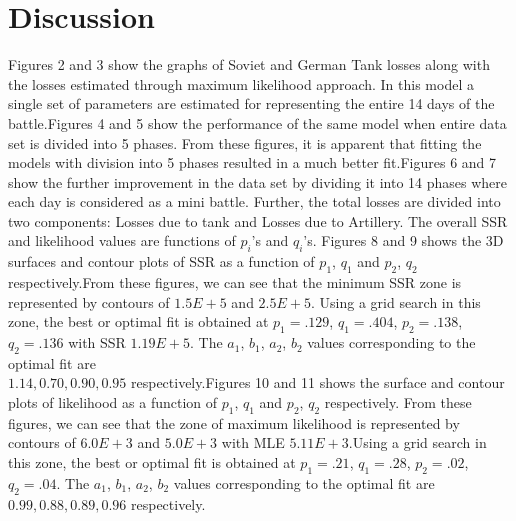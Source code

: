 \documentclass[]{article}
\begin{document}
\section{Discussion}
Figures 2 and 3 show the graphs of Soviet and German Tank losses along with the losses estimated through maximum likelihood approach. In this model a single set of parameters are estimated for representing the entire 14 days of the battle.Figures 4 and 5 show the performance of the same model when entire data set is divided into 5 phases. From these figures, it is apparent that fitting the models with division into 5 phases resulted in a much better fit.Figures 6 and 7 show the further improvement in the data set by dividing it into 14 phases where each day is considered as a mini battle. Further, the total losses are divided into two components: Losses due to tank and Losses due to Artillery. The overall SSR and likelihood values are functions of $p_i$’s and $q_i$’s. Figures 8 and 9 shows the 3D surfaces and contour plots of SSR as a function of $p_1$, $q_1$ and $p_2$, $q_2$ respectively.From these figures, we can see that the minimum SSR zone is represented by contours of $1.5E+5$ and $2.5E+5$. Using a grid search in this zone, the best or optimal fit is obtained at $p_1=.129$, $q_1=.404$, $p_2=.138$, $q_2=.136$ with SSR $1.19E+5$. The $a_1$, $b_1$, $a_2$, $b_2$ values corresponding to the optimal fit are\\ $1.14, 0.70, 0.90, 0.95$ respectively.Figures 10 and 11 shows the surface and contour plots of likelihood as a function of $p_1$, $q_1$ and $p_2$, $q_2$ respectively. From these figures, we can see that the zone of maximum likelihood is represented by contours of $6.0E+3$ and $5.0E+3$ with MLE $5.11E+3$.Using a grid search in this zone, the best or optimal fit is obtained at $p_1=.21$, $q_1=.28$, $p_2=.02$, $q_2=.04$. The $a_1$, $b_1$, $a_2$, $b_2$ values corresponding to the optimal fit are $0.99, 0.88, 0.89, 0.96$ respectively.
\end{document}
